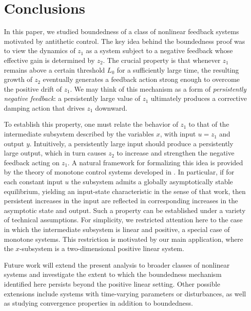 \documentclass{article}
\begin{document}
\section{Conclusions}\label{sec:conclusion}

In this paper, we studied boundedness of a class of nonlinear feedback systems motivated by antithetic control. 
The key idea behind the boundedness proof was to view the dynamics of $z_1$ as a system subject to a negative feedback whose effective gain is determined by $z_2$. The crucial property is that whenever $z_1$ remains above a certain threshold $L_0$ for a sufficiently large time, the resulting growth of $z_2$ eventually generates a feedback action strong enough to overcome the positive drift of $z_1$. We may think of this mechanism as a form of \emph{persistently negative feedback}: a persistently large value of $z_1$ ultimately produces a corrective damping action that drives $z_1$ downward.

To establish this property, one must relate the behavior of $z_1$ to that of the intermediate subsystem described by the variables $x$, with input $u=z_1$ and output $y$. Intuitively, a persistently large input should produce a persistently large output, which in turn causes $z_2$ to increase and strengthen the negative feedback acting on $z_1$. A natural framework for formalizing this idea is provided by the theory of monotone control systems developed in \cite{monotoneTAC}. In particular, if for each constant input $u$ the subsystem admits a globally asymptotically stable equilibrium, yielding an input-state characteristic in the sense of that work, then persistent increases in the input are reflected in corresponding increases in the asymptotic state and output. Such a property can be established under a variety of technical assumptions. For simplicity, we restricted attention here to the case in which the intermediate subsystem is linear and positive, a special case of monotone systems. This restriction is motivated by our main application, where the $x$-subsystem is a two-dimensional positive linear system. 

Future work will extend the present analysis to broader classes of nonlinear systems and investigate the extent to which the boundedness mechanism identified here persists beyond the positive linear setting.
Other possible extensions include systems with time-varying parameters or disturbances, as well as studying convergence properties in addition to boundedness.

\appendix
\end{document}
